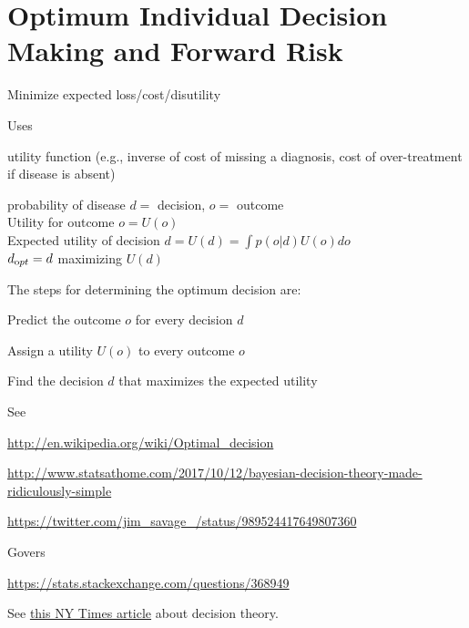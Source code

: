 \section{Optimum Individual Decision Making and Forward Risk}
\bi
\item Minimize expected loss/cost/disutility
\item Uses
 \bi
 \item utility function (e.g., inverse of cost of missing a diagnosis, cost of
 over-treatment if disease is absent)
 \item probability of disease
 \ei
\ei
$d =$ decision, $o =$ outcome\\
Utility for outcome $o = U(o)$\\
Expected utility of decision $d = U(d) = \int p(o | d) U(o)do$\\
$d_{\textrm opt} = d$ maximizing $U(d)$

The steps for determining the optimum decision are:
\be
\item Predict the outcome $o$ for every decision $d$
\item Assign a utility $U(o)$ to every outcome $o$
\item Find the decision $d$ that maximizes the expected utility
\ee

See
\bi
\item \url{http://en.wikipedia.org/wiki/Optimal_decision}
\item \url{http://www.statsathome.com/2017/10/12/bayesian-decision-theory-made-ridiculously-simple}
\item \url{https://twitter.com/jim_savage_/status/989524417649807360}
\item Govers~\etal~\cite{gov18int}
\item \url{https://stats.stackexchange.com/questions/368949}
\ei


See
\href{https://www.nytimes.com/2018/09/01/opinion/sunday/how-make-big-decision.html}{this NY Times article} about decision theory.

